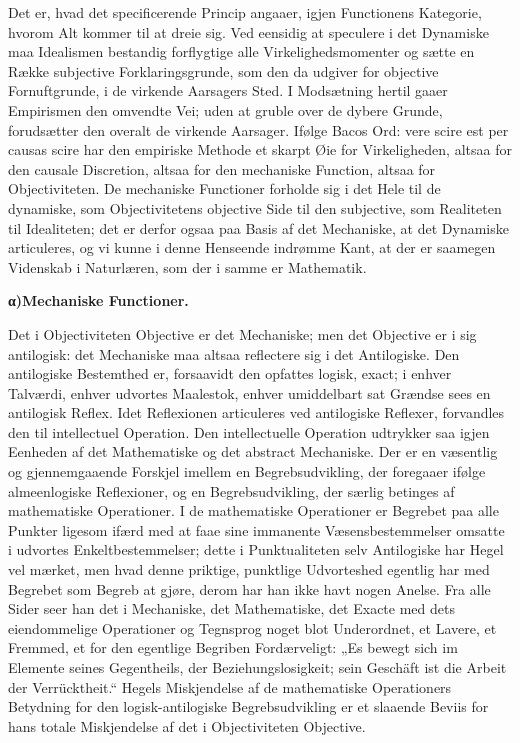 \documentclass[12pt]{book}
\newcommand{\opage}[1]{\marginnote{\footnotesize\textit{[#1]}}}
\begin{document}
Det er, hvad det specificerende Princip angaaer, igjen Functionens Kategorie, hvorom
Alt kommer til at dreie sig. Ved eensidig at speculere i det Dynamiske maa Idealismen
bestandig forflygtige alle Virkelighedsmomenter og sætte en Række subjective
Forklaringsgrunde, som den da udgiver for objective Fornuftgrunde, i de virkende
Aarsagers Sted. I Modsætning hertil gaaer Empirismen den omvendte Vei; uden at gruble
over de dybere Grunde, forudsætter den overalt de virkende Aarsager. Ifølge Bacos Ord:
vere scire est per causas scire har den empiriske Methode et skarpt Øie for
Virkeligheden, altsaa for den causale Discretion, altsaa for den mechaniske Function,
altsaa for Objectiviteten. De mechaniske Functioner forholde sig i det Hele til de
dynamiske, som Objectivitetens objective Side til den subjective, som Realiteten til
Idealiteten; det er derfor ogsaa paa Basis af det Mechaniske, at det Dynamiske
articuleres, og vi kunne i denne Henseende indrømme Kant, at der er saamegen Videnskab
i Naturlæren, som der i samme er Mathematik.

\begin{center}{\bfseries α)\quad Mechaniske Functioner.}\end{center}

Det i Objectiviteten Objective er det Mechaniske; men det Objective er i sig
antilogisk: det Mechaniske maa altsaa reflectere sig i det Antilogiske. Den antilogiske
Bestemthed er, forsaavidt den opfattes logisk, exact; i enhver Talværdi, enhver
udvortes Maalestok, enhver umiddelbart sat Grændse
\opage{335} sees en antilogisk Reflex. Idet Reflexionen articuleres ved antilogiske Reflexer,
forvandles den til intellectuel Operation. Den intellectuelle Operation udtrykker saa
igjen Eenheden af det Mathematiske og det abstract Mechaniske. Der er en væsentlig og
gjennemgaaende Forskjel imellem en Begrebsudvikling, der foregaaer ifølge almeenlogiske
Reflexioner, og en Begrebsudvikling, der særlig betinges af mathematiske Operationer. I
de mathematiske Operationer er Begrebet paa alle Punkter ligesom ifærd med at faae sine
immanente Væsensbestemmelser omsatte i udvortes Enkeltbestemmelser; dette i
Punktualiteten selv Antilogiske har Hegel vel mærket, men hvad denne priktige, punktlige
Udvorteshed egentlig har med Begrebet som Begreb at gjøre, derom har han ikke havt nogen
Anelse. Fra alle Sider seer han det i Mechaniske, det Mathematiske, det Exacte med dets
eiendommelige Operationer og Tegnsprog noget blot Underordnet, et Lavere, et Fremmed, et
for den egentlige Begriben Fordærveligt: „Es bewegt sich im Elemente seines Gegentheils,
der Beziehungslosigkeit; sein Geschäft ist die Arbeit der Verrücktheit.“ Hegels
Miskjendelse af de mathematiske Operationers Betydning for den logisk-antilogiske
Begrebsudvikling er et slaaende Beviis for hans totale Miskjendelse af det i
Objectiviteten Objective.
\end{document}
